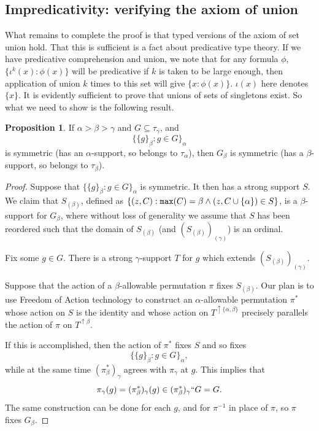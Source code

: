 \documentclass{article}
\theoremstyle{definition}
\newtheorem{proposition}[theorem]{Proposition}
\theoremstyle{remark}
\begin{document}
{\newpage
\subsection{Impredicativity:  verifying the axiom of union}\label{ss:impredicativity}

What remains to complete the proof is that typed versions of the axiom of set union hold.  That this is sufficient is a fact about predicative type theory.
If we have predicative comprehension and union, we note that for any formula $\phi$, $\{\iota^k(x):\phi(x)\}$ will be predicative if $k$ is taken to be large enough, then application of union $k$ times to this set will give $\{x:\phi(x)\}$.  $\iota(x)$ here denotes $\{x\}$.  It is evidently sufficient to prove that unions of sets of singletons exist.
So what we need to show is the following result.


\begin{proposition}\label{prop:unions_of_singletons}
If  $\alpha>\beta>\gamma$ and $G \subseteq \tau_\gamma$, and $$\{\{g\}_\beta:g \in G\}_\alpha$$ is symmetric (has an $\alpha$-support, so belongs to $\tau_\alpha$), then $G_\beta$ is symmetric (has a $\beta$-support, so belongs to $\tau_\beta$).
\end{proposition}
\begin{proof}
Suppose that $\{\{g\}_\beta:g \in G\}_\alpha$ is symmetric.  It then has a strong support $S$.  We claim that $S_{(\beta)}$, defined as $\{(z,C): {\tt max}(C)=\beta \wedge (z,C\cup \{\alpha\}) \in S\}$,  is a $\beta$-support for $G_\beta$, where without loss of generality we assume that $S$ has been reordered such that the domain of $S_{(\beta)}$ (and $(S_{(\beta)})_{(\gamma)}$) is an ordinal.

Fix some $g \in G$. There is a strong $\gamma$-support $T$ for $g$ which extends $(S_{(\beta)})_{(\gamma)}$.

Suppose that the action of a $\beta$-allowable permutation $\pi$ fixes $S_{(\beta)}$.
Our plan is to use Freedom of Action technology to construct an $\alpha$-allowable permutation $\pi^*$ whose action on $S$ is the identity
and whose action on $T^{\uparrow\{\alpha,\beta\}}$ precisely parallels the action of $\pi$ on $T^{\uparrow\beta}$.

If this is accomplished, then the action of $\pi^*$ fixes $S$ and so fixes $$\{\{g\}_\beta:g \in G\}_\alpha,$$ while at the same
time $(\pi^*_\beta)_\gamma$ agrees with $\pi_\gamma$ at $g$.  This implies that
$$ \pi_\gamma(g) = (\pi^*_\beta)_\gamma(g) \in (\pi^*_\beta)_\gamma `` G = G. $$
The same construction can be done for each $g$, and for $\pi^{-1}$ in place of $\pi$, so $\pi$ fixes $G_\beta$.


\end{proof}}
\end{document}
